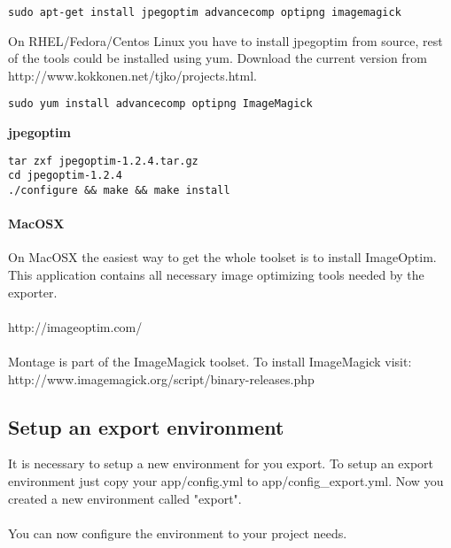 \begin{verbatim}
sudo apt-get install jpegoptim advancecomp optipng imagemagick
\end{verbatim}

\noindent On RHEL/Fedora/Centos Linux you have to install jpegoptim from source, rest of the tools could be installed using yum. Download the current version from http://www.kokkonen.net/tjko/projects.html. \\


\begin{verbatim}
sudo yum install advancecomp optipng ImageMagick
\end{verbatim}

\noindent \textbf{jpegoptim}
\begin{verbatim}
tar zxf jpegoptim-1.2.4.tar.gz
cd jpegoptim-1.2.4
./configure && make && make install
\end{verbatim}


\paragraph{MacOSX\\}
\noindent On MacOSX the easiest way to get the whole toolset is to install ImageOptim. This application contains all necessary image optimizing tools needed by the exporter.\\
\\
http://imageoptim.com/\\
\\
Montage is part of the ImageMagick toolset. To install ImageMagick visit:\\
http://www.imagemagick.org/script/binary-releases.php\\

\subsection{Setup an export environment}

It is necessary to setup a new environment for you export. To setup an export environment just copy your app/config.yml to app/config\_export.yml. Now you created a new environment called "export". \\
\\
You can now configure the environment to your project needs. \\
